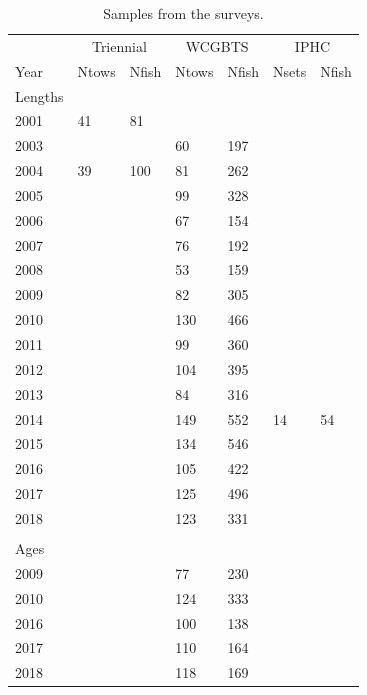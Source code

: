 \documentclass[12pt,]{article}
\begin{document}
\begin{table}[ht]
\centering
\caption{Samples from the surveys.} 
\label{tab:Survey_Samples}
\begin{tabular}{lllllll}
  \hline
   \multicolumn{1}{c}{} & \multicolumn{2}{c}{Triennial} & \multicolumn{2}{c}{WCGBTS} & \multicolumn{2}{c}{IPHC} \\  \cmidrule(lr){2-3} \cmidrule(lr){4-5} \cmidrule(lr){6-7}
  Year & Ntows & Nfish & Ntows & Nfish & Nsets & Nfish \\ 
  \hline
Lengths &  &  &  &  &  &  \\ 
  2001 & 41 & 81 &  &  &  &  \\ 
  2003 &  &  & 60 & 197 &  &  \\ 
  2004 & 39 & 100 & 81 & 262 &  &  \\ 
  2005 &  &  & 99 & 328 &  &  \\ 
  2006 &  &  & 67 & 154 &  &  \\ 
  2007 &  &  & 76 & 192 &  &  \\ 
  2008 &  &  & 53 & 159 &  &  \\ 
  2009 &  &  & 82 & 305 &  &  \\ 
  2010 &  &  & 130 & 466 &  &  \\ 
  2011 &  &  & 99 & 360 &  &  \\ 
  2012 &  &  & 104 & 395 &  &  \\ 
  2013 &  &  & 84 & 316 &  &  \\ 
  2014 &  &  & 149 & 552 & 14 & 54 \\ 
  2015 &  &  & 134 & 546 &  &  \\ 
  2016 &  &  & 105 & 422 &  &  \\ 
  2017 &  &  & 125 & 496 &  &  \\ 
  2018 &  &  & 123 & 331 &  &  \\ 
   &  &  &  &  &  &  \\ 
  Ages &  &  &  &  &  &  \\ 
  2009 &  &  & 77 & 230 &  &  \\ 
  2010 &  &  & 124 & 333 &  &  \\ 
  2016 &  &  & 100 & 138 &  &  \\ 
  2017 &  &  & 110 & 164 &  &  \\ 
  2018 &  &  & 118 & 169 &  &  \\ 
   \hline
  \end{tabular}
\end{table}

\FloatBarrier
\newpage
\end{document}

